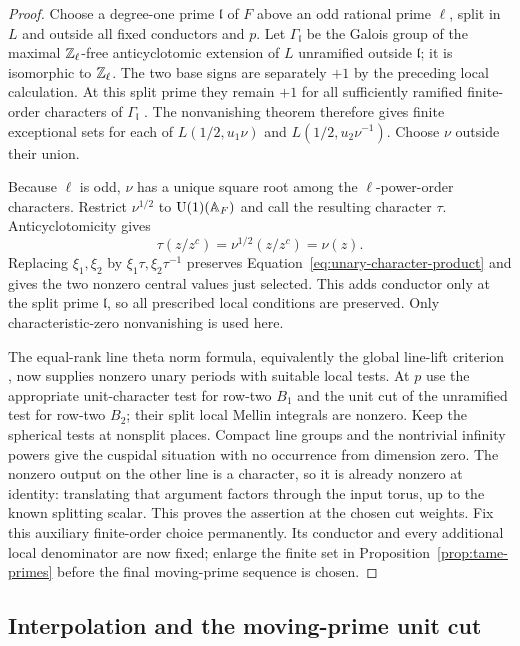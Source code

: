 \begin{proof}
 Choose a degree-one prime $\mathfrak l$ of $F$ above an odd rational
 prime $\ell$, split in $L$ and outside all fixed conductors and $p$.
 Let $\Gamma_{\mathfrak l}$ be the Galois group of the maximal
 $\mathbb Z_\ell$-free anticyclotomic extension of $L$ unramified outside
 $\mathfrak l$; it is isomorphic to $\mathbb Z_\ell$.
 The two base signs are separately $+1$ by the preceding local
 calculation.  At this split prime they remain $+1$ for all sufficiently
 ramified finite-order characters of $\Gamma_{\mathfrak l}$
 \cite[Lemma~4.12 and Section~4.4.3]{BHTY2026}.
 The nonvanishing theorem therefore gives finite exceptional sets for
 each of $L(1/2,u_1\nu)$ and $L(1/2,u_2\nu^{-1})$.
 Choose $\nu$ outside their union.

 Because $\ell$ is odd, $\nu$ has a unique square root among the
 $\ell$-power-order characters.  Restrict $\nu^{1/2}$ to
 $\operatorname{U}(1)(\mathbb A_F)$ and call the resulting character $\tau$.
 Anticyclotomicity gives
 \[
  \tau(z/z^c)=\nu^{1/2}(z/z^c)=\nu(z).
 \]
 Replacing $\xi_1,\xi_2$ by $\xi_1\tau,\xi_2\tau^{-1}$
 preserves Equation~\ref{eq:unary-character-product} and gives the
 two nonzero central values just selected.  This adds conductor only at
 the split prime $\mathfrak l$, so all prescribed local conditions are
 preserved.  Only characteristic-zero nonvanishing is used here.

 The equal-rank line theta norm formula, equivalently the global
 line-lift criterion
 \cite[Theorem~4.2 and Proposition~4.3]{BoradeEtAl2025}, now supplies nonzero unary periods
 with suitable local tests.  At $p$ use the appropriate unit-character
 test for row-two $B_1$ and the unit cut of the unramified test for
 row-two $B_2$; their split local Mellin integrals are nonzero.
 Keep the spherical tests at nonsplit places.  Compact line groups
 and the nontrivial infinity powers give the cuspidal situation with
 no occurrence from dimension zero.  The nonzero output on the other
 line is a character, so it is already nonzero at identity: translating
 that argument factors through the input torus, up to the known
 splitting scalar.  This proves the assertion at the chosen cut
 weights.  Fix this auxiliary finite-order choice permanently.  Its
 conductor and every additional local denominator are now fixed;
 enlarge the finite set in Proposition~\ref{prop:tame-primes} before
 the final moving-prime sequence is chosen.
\end{proof}

\subsection{Interpolation and the moving-prime unit cut}

